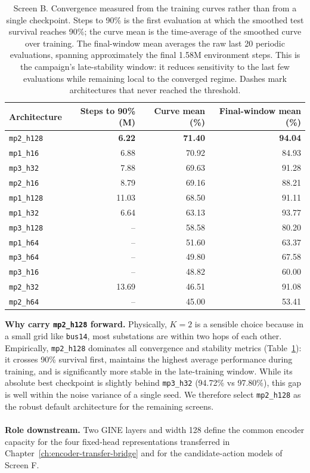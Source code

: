 \begin{table}[H]
  \centering
  \small
  \caption{Screen B. Convergence measured from the training curves rather than
  from a single checkpoint. Steps to 90\% is the first evaluation at which the
  smoothed test survival reaches 90\%; the curve mean is the time-average of
  the smoothed curve over training. The final-window mean averages the raw last
  20 periodic evaluations, spanning approximately the final 1.58M environment
  steps. This is the campaign's late-stability window: it reduces sensitivity
  to the last few evaluations while remaining local to the converged regime.
  Dashes mark architectures that never reached the threshold.}
  \label{tab:depth-width-convergence}
  \setlength{\tabcolsep}{5pt}
  \begin{tabular}{lrrr}
    \toprule
    Architecture & Steps to 90\% (M) & Curve mean (\%) & Final-window mean (\%) \\
    \midrule
    \texttt{mp2\_h128} & \textbf{6.22} & \textbf{71.40} & \textbf{94.04} \\
    \texttt{mp1\_h16} & 6.88 & 70.92 & 84.93 \\
    \texttt{mp3\_h32} & 7.88 & 69.63 & 91.28 \\
    \texttt{mp2\_h16} & 8.79 & 69.16 & 88.21 \\
    \texttt{mp1\_h128} & 11.03 & 68.50 & 91.11 \\
    \texttt{mp1\_h32} & 6.64 & 63.13 & 93.77 \\
    \texttt{mp3\_h128} & -- & 58.58 & 80.20 \\
    \texttt{mp1\_h64} & -- & 51.60 & 63.37 \\
    \texttt{mp3\_h64} & -- & 49.80 & 67.58 \\
    \texttt{mp3\_h16} & -- & 48.82 & 60.00 \\
    \texttt{mp2\_h32} & 13.69 & 46.51 & 91.08 \\
    \texttt{mp2\_h64} & -- & 45.00 & 53.41 \\
    \bottomrule
  \end{tabular}
\end{table}

\noindent \textbf{Why carry \texttt{mp2\_h128} forward.} Physically, $K=2$ is a sensible choice because in a small grid like \texttt{bus14}, most substations are within two hops of each other. Empirically, \texttt{mp2\_h128} dominates all convergence and stability metrics (Table~\ref{tab:depth-width-convergence}): it crosses 90\% survival first, maintains the highest average performance during training, and is significantly more stable in the late-training window. While its absolute best checkpoint is slightly behind \texttt{mp3\_h32} (94.72\% vs 97.80\%), this gap is well within the noise variance of a single seed. We therefore select \texttt{mp2\_h128} as the robust default architecture for the remaining screens.
\\
\\
\noindent\textbf{Role downstream.} Two GINE layers and width
128 define the common encoder capacity for the four fixed-head representations
transferred in Chapter~\ref{ch:encoder-transfer-bridge} and for the
candidate-action models of Screen F.

